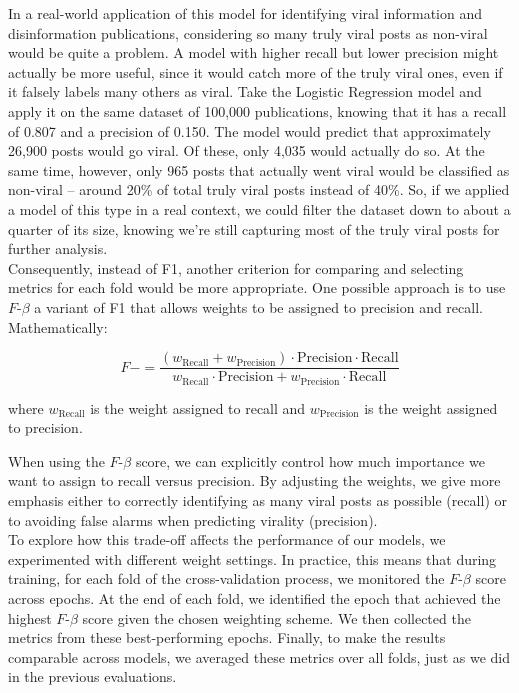 \documentclass[a4paper,twoside,12pt]{book}
\begin{document}
In a real-world application of this model for identifying viral information and disinformation publications, considering so many truly viral posts as non-viral would be quite a problem. A model with higher recall but lower precision might actually be more useful, since it would catch more of the truly viral ones, even if it falsely labels many others as viral. Take the Logistic Regression model and apply it on the same dataset of 100,000 publications, knowing that it has a recall of 0.807 and a precision of 0.150. The model would predict that approximately 26,900 posts would go viral. Of these, only 4,035 would actually do so. At the same time, however, only 965 posts that actually went viral would be classified as non-viral -- around 20\% of total truly viral posts instead of 40\%. So, if we applied a model of this type in a real context, we could filter the dataset down to about a quarter of its size, knowing we’re still capturing most of the truly viral posts for further analysis.\\

Consequently, instead of F1, another criterion for comparing and selecting metrics for each fold would be more appropriate. One possible approach is to use $F\text{-}\beta$ a variant of F1 that allows weights to be assigned to precision and recall. Mathematically:

$$
F- = \frac{(w_{\text{Recall}} + w_{\text{Precision}}) \cdot \text{Precision} \cdot \text{Recall}}{w_{\text{Recall}} \cdot \text{Precision} + w_{\text{Precision}} \cdot \text{Recall}}
$$

where $w_{\text{Recall}}$ is the weight assigned to recall and $w_{\text{Precision}}$ is the weight assigned to precision.


When using the $F\text{-}\beta$ score, we can explicitly control how much importance we want to assign to recall versus precision. By adjusting the weights, we give more emphasis either to correctly identifying as many viral posts as possible (recall) or to avoiding false alarms when predicting virality (precision).\\

To explore how this trade-off affects the performance of our models, we experimented with different weight settings. In practice, this means that during training, for each fold of the cross-validation process, we monitored the $F\text{-}\beta$ score across epochs. At the end of each fold, we identified the epoch that achieved the highest $F\text{-}\beta$ score given the chosen weighting scheme. We then collected the metrics from these best-performing epochs. Finally, to make the results comparable across models, we averaged these metrics over all folds, just as we did in the previous evaluations. 
\end{document}
